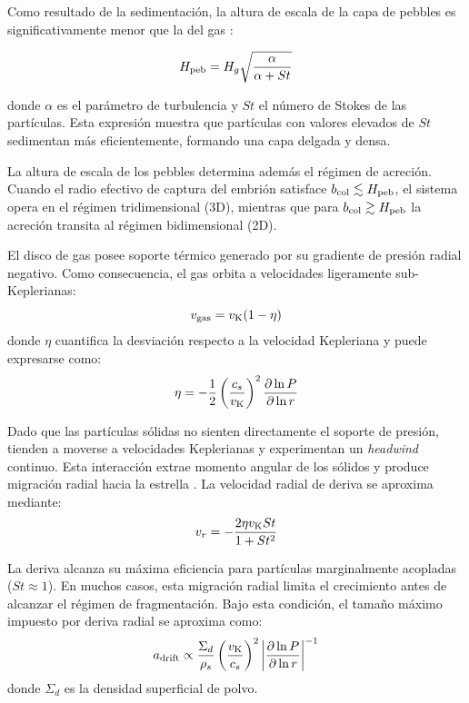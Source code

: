 Como resultado de la sedimentación, la altura de escala de la capa de pebbles es significativamente menor que la del gas \citep{Birnstiel2012, Ormel2017}:

\begin{equation}
H_{\rm peb} = H_g \sqrt{\frac{\alpha}{\alpha + St}}
\end{equation}

donde $\alpha$ es el parámetro de turbulencia y $St$ el número de Stokes de las partículas. Esta expresión muestra que partículas con valores elevados de $St$ sedimentan más eficientemente, formando una capa delgada y densa.

La altura de escala de los pebbles determina además el régimen de acreción. Cuando el radio efectivo de captura del embrión satisface $b_{\rm col}\lesssim H_{\rm peb}$, el sistema opera en el régimen tridimensional (3D), mientras que para $b_{\rm col}\gtrsim H_{\rm peb}$ la acreción transita al régimen bidimensional (2D).



El disco de gas posee soporte térmico generado por su gradiente de presión radial negativo. Como consecuencia, el gas orbita a velocidades ligeramente sub-Keplerianas:
\begin{equation}
v_{\rm gas} = v_{\rm K}(1-\eta)
\end{equation}
donde $\eta$ cuantifica la desviación respecto a la velocidad Kepleriana y puede expresarse como:
\begin{equation}
\eta = -\frac{1}{2}\left(\frac{c_s}{v_{\rm K}}\right)^2 \frac{\partial \ln P}{\partial \ln r}
\end{equation}

Dado que las partículas sólidas no sienten directamente el soporte de presión, tienden a moverse a velocidades Keplerianas y experimentan un \textit{headwind} continuo. Esta interacción extrae momento angular de los sólidos y produce migración radial hacia la estrella \citep{Birnstiel2012, Laibe2012}. La velocidad radial de deriva se aproxima mediante:
\begin{equation}
v_r = -\frac{2\eta v_{\rm K} St}{1+St^2}
\end{equation}

La deriva alcanza su máxima eficiencia para partículas marginalmente acopladas ($St \approx 1$). En muchos casos, esta migración radial limita el crecimiento antes de alcanzar el régimen de fragmentación. Bajo esta condición, el tamaño máximo impuesto por deriva radial se aproxima como:
\begin{equation}
a_{\rm drift} \propto \frac{\Sigma_d}{\rho_s}
\left(\frac{v_{\rm K}}{c_s}\right)^2
\left|\frac{\partial \ln P}{\partial \ln r}\right|^{-1}
\end{equation}
donde $\Sigma_d$ es la densidad superficial de polvo.

